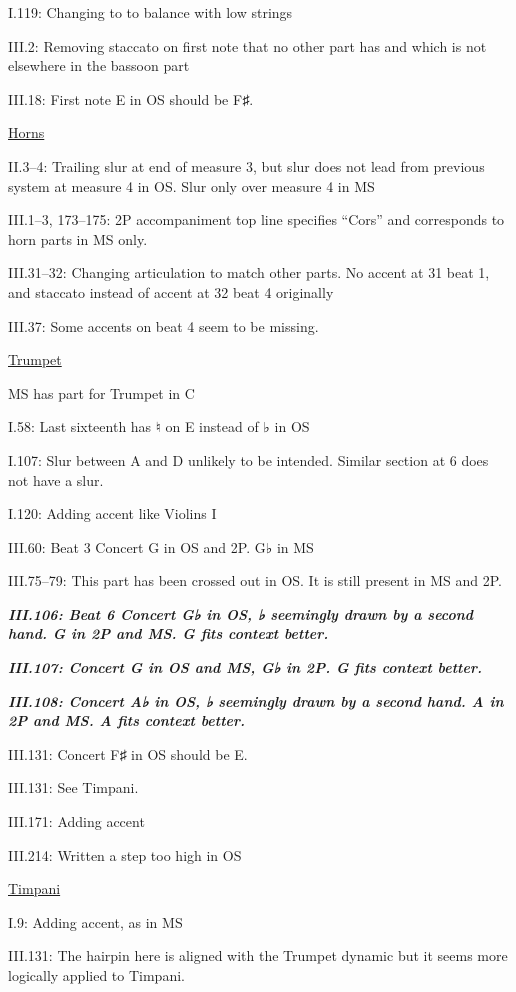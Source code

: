 \documentclass[twoside]{article}
\newcommand\dynmark[1]{\scalebox{0.9}{#1}{\kern1pt}}
\begin{document}
\begin{hangparas}{15pt}{1}
\begin{multicols}{2}
I.119: Changing \dynmark{\f} to \dynmark{\ff} to balance with low strings

III.2: Removing staccato on first note that no other part has and which is not elsewhere in the bassoon part

III.18: First note E in OS should be F♯.

\underline{Horns}

II.3--4: Trailing slur at end of measure 3, but slur does not lead from previous system at measure 4 in OS. Slur only over measure 4 in MS

III.1--3, 173--175: 2P accompaniment top line specifies ``Cors'' and corresponds to horn parts in MS only.

III.31--32: Changing articulation to match other parts. No accent at 31 beat 1, and staccato instead of accent at 32 beat 4 originally

III.37: Some accents on beat 4 seem to be missing.

\underline{Trumpet}

MS has part for Trumpet in C

I.58: Last sixteenth has ♮ on E instead of ♭ in OS

I.107: Slur between A and D unlikely to be intended. Similar section at 6 does not have a slur.

I.120: Adding accent like Violins I

III.60: Beat 3 Concert G in OS and 2P. G♭ in MS

III.75--79: This part has been crossed out in OS. It is still present in MS and 2P.

\textbf{\textit{III.106: Beat 6 Concert G♭ in OS, ♭ seemingly drawn by a second hand. G in 2P and MS. G fits context better.}}

\textbf{\textit{III.107: Concert G in OS and MS, G♭ in 2P. G fits context better.}}

\textbf{\textit{III.108: Concert A♭ in OS, ♭ seemingly drawn by a second hand. A in 2P and MS. A fits context better.}}

III.131: Concert F♯ in OS should be E.

III.131: See Timpani.

III.171: Adding accent

III.214: Written a step too high in OS

\underline{Timpani}

I.9: Adding accent, as in MS

III.131: The hairpin here is aligned with the Trumpet dynamic but it seems more logically applied to Timpani.


\end{multicols}
\end{hangparas}
\end{document}
